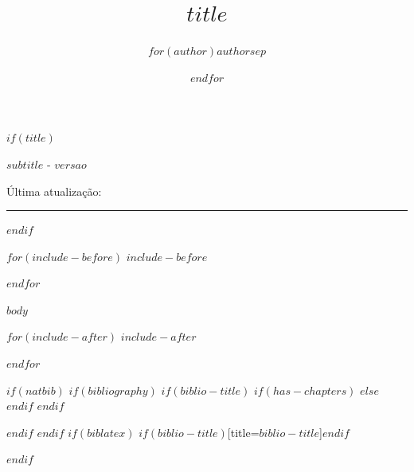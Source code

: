 \documentclass[
$if(fontsize)$
  $fontsize$,
$endif$
$if(papersize)$
  $papersize$paper,
$endif$
$for(classoption)$
  $classoption$$sep$,
$endfor$
]{$documentclass$}
\title{$title$}
\author{$for(author)$$author$$sep$ \and $endfor$}
\makeatletter
\let\newtitle\@title
\let\newdate\@date
\makeatother
\begin{document}
$if(title)$
{\Huge\newtitle}

{\large $subtitle$ - $versao$}

Última atualização: \newdate

\par\noindent\rule{\textwidth}{0.4pt}

$endif$

\thispagestyle{first}

$for(include-before)$
$include-before$

$endfor$

$body$

$for(include-after)$
$include-after$

$endfor$



$if(natbib)$
$if(bibliography)$
$if(biblio-title)$
$if(has-chapters)$
\renewcommand\bibname{$biblio-title$}
$else$
\renewcommand\refname{$biblio-title$}
$endif$
$endif$


$endif$
$endif$
$if(biblatex)$
\printbibliography$if(biblio-title)$[title=$biblio-title$]$endif$

$endif$
\end{document}

